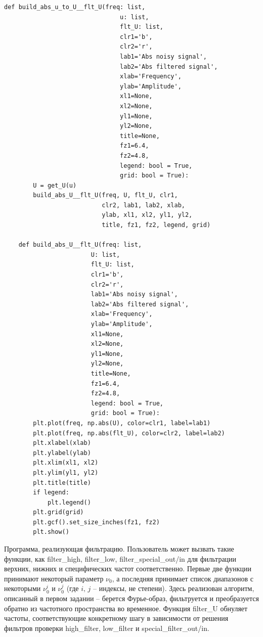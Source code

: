 \documentclass[a4paper, 12pt]{article}
\begin{document}
\begin{lstlisting}[label=l3, caption={Файл builder.py. Реализация построения графиков}]
    def build_abs_u_to_U__flt_U(freq: list,
                                u: list,
                                flt_U: list,
                                clr1='b',
                                clr2='r',
                                lab1='Abs noisy signal',
                                lab2='Abs filtered signal',
                                xlab='Frequency',
                                ylab='Amplitude',
                                xl1=None,
                                xl2=None,
                                yl1=None,
                                yl2=None,
                                title=None,
                                fz1=6.4,
                                fz2=4.8,
                                legend: bool = True,
                                grid: bool = True):
        U = get_U(u)
        build_abs_U__flt_U(freq, U, flt_U, clr1,
                           clr2, lab1, lab2, xlab,
                           ylab, xl1, xl2, yl1, yl2,
                           title, fz1, fz2, legend, grid)

    def build_abs_U__flt_U(freq: list,
                        U: list,
                        flt_U: list,
                        clr1='b',
                        clr2='r',
                        lab1='Abs noisy signal',
                        lab2='Abs filtered signal',
                        xlab='Frequency',
                        ylab='Amplitude',
                        xl1=None,
                        xl2=None,
                        yl1=None,
                        yl2=None,
                        title=None,
                        fz1=6.4,
                        fz2=4.8,
                        legend: bool = True,
                        grid: bool = True):
        plt.plot(freq, np.abs(U), color=clr1, label=lab1)
        plt.plot(freq, np.abs(flt_U), color=clr2, label=lab2)
        plt.xlabel(xlab)
        plt.ylabel(ylab)
        plt.xlim(xl1, xl2)
        plt.ylim(yl1, yl2)
        plt.title(title)
        if legend:
            plt.legend()
        plt.grid(grid)
        plt.gcf().set_size_inches(fz1, fz2)
        plt.show()
    \end{lstlisting}


    Программа, реализующая фильтрацию. Пользователь может вызвать такие функции, как filter\_{high}, filter\_{low}, filter\_{special}\_{out}/{in}
    для фильтрации верхних, нижних и специфических частот соответственно. Первые две функции принимают некоторый параметр
    $\nu_0$, а последняя принимает список диапазонов с некоторыми $\nu_{0}^{i}$ и $\nu_{0}^{j}$ (где $i,\,j$ -- индексы, не степени).
    Здесь реализован алгоритм, описанный в первом задании -- берется Фурье-образ, фильтруется и преобразуется обратно из частотного
    пространства во временное. Функция filter\_{U} обнуляет частоты, соответствующие конкретному шагу в зависимости от решения фильтров
    проверки high\_{filter}, low\_{filter} и special\_{filter}\_{out}/{in}.
\end{document}
